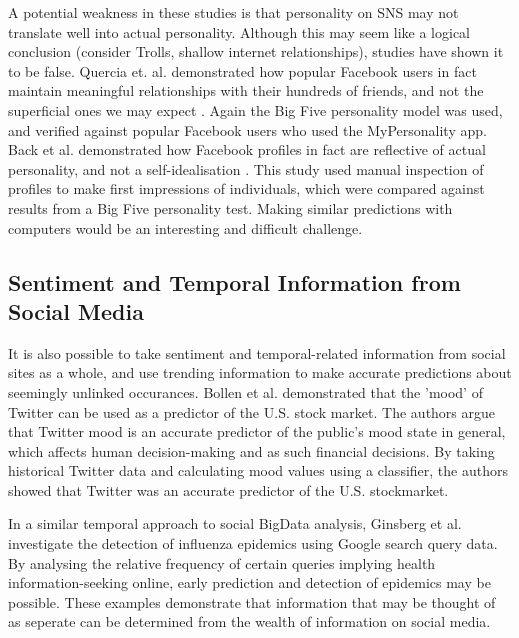 A potential weakness in these studies is that personality on SNS may not translate well into actual personality. Although this may seem like a logical conclusion (consider Trolls, shallow internet relationships), studies have shown it to be false. Quercia et. al. demonstrated how popular Facebook users in fact maintain meaningful relationships with their hundreds of friends, and not the superficial ones we may expect \cite{quercia2012personality}. Again the Big Five personality model was used, and verified against popular Facebook users who used the MyPersonality app. Back et al. \cite{back2010facebook} demonstrated how Facebook profiles in fact are reflective of actual personality, and not a self-idealisation . This study used manual inspection of profiles to make first impressions of individuals, which were compared against results from a Big Five personality test. Making similar predictions with computers would be an interesting and difficult challenge. 

\subsection{Sentiment and Temporal Information from Social Media}

It is also possible to take sentiment and temporal-related information from social sites as a whole, and use trending information to make accurate predictions about seemingly unlinked occurances. Bollen et al. \cite{bollen2011twitter} demonstrated that the 'mood' of Twitter can be used as a predictor of the U.S. stock market. The authors argue that Twitter mood is an accurate predictor of the public's mood state in general, which affects human decision-making and as such financial decisions. By taking historical Twitter data and calculating mood values using a classifier, the authors showed that Twitter was an accurate predictor of the U.S. stockmarket.

In a similar temporal approach to social BigData analysis, Ginsberg et al. \cite{ginsberg2008detecting} investigate the detection of influenza epidemics using Google search query data. By analysing the relative frequency of certain queries implying health information-seeking online, early prediction and detection of epidemics may be possible. These examples demonstrate that information that may be thought of as seperate can be determined from the wealth of information on social media.


